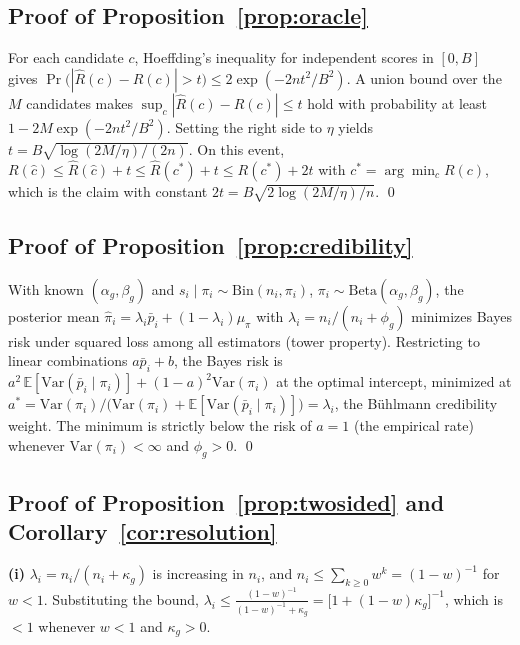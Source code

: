 \documentclass[twocolumn,10pt]{article}
\newcommand{\E}{\mathbb{E}}
\newcommand{\Var}{\mathrm{Var}}
\begin{document}
\subsection{Proof of Proposition~\ref{prop:oracle}}
For each candidate $c$, Hoeffding's inequality for independent scores in
$[0,B]$ gives
$\Pr\bigl(|\hat R(c)-R(c)|>t\bigr)\le2\exp(-2nt^2/B^2)$. A union bound
over the $M$ candidates makes
$\sup_c|\hat R(c)-R(c)|\le t$ hold with probability at least
$1-2M\exp(-2nt^2/B^2)$. Setting the right side to $\eta$ yields
$t=B\sqrt{\log(2M/\eta)/(2n)}$. On this event,
$R(\hat c)\le\hat R(\hat c)+t\le\hat R(c^{*})+t\le R(c^{*})+2t$ with
$c^{*}=\arg\min_c R(c)$, which is the claim with constant
$2t=B\sqrt{2\log(2M/\eta)/n}$. \qed

\subsection{Proof of Proposition~\ref{prop:credibility}}
With known $(\alpha_g,\beta_g)$ and $s_i\mid\pi_i\sim
\mathrm{Bin}(n_i,\pi_i)$, $\pi_i\sim\mathrm{Beta}(\alpha_g,\beta_g)$,
the posterior mean $\hat\pi_i=\lambda_i\bar p_i+(1-\lambda_i)\mu_\pi$
with $\lambda_i=n_i/(n_i+\phi_g)$ minimizes Bayes risk under squared
loss among all estimators (tower property). Restricting to linear
combinations $a\bar p_i+b$, the Bayes risk is
$a^2\,\E[\Var(\bar p_i\mid\pi_i)] + (1-a)^2\Var(\pi_i)$ at the optimal
intercept, minimized at
$a^{*}=\Var(\pi_i)/\bigl(\Var(\pi_i)+\E[\Var(\bar p_i\mid\pi_i)]\bigr)
=\lambda_i$, the B\"uhlmann credibility weight. The minimum is strictly
below the risk of $a=1$ (the empirical rate) whenever
$\Var(\pi_i)<\infty$ and $\phi_g>0$. \qed

\subsection{Proof of Proposition~\ref{prop:twosided} and
Corollary~\ref{cor:resolution}}

\textbf{(i)} $\lambda_i=n_i/(n_i+\kappa_g)$ is increasing in $n_i$, and
$n_i\le\sum_{k\ge0}w^{k}=(1-w)^{-1}$ for $w<1$. Substituting the bound,
$\lambda_i\le\frac{(1-w)^{-1}}{(1-w)^{-1}+\kappa_g}
=\bigl[1+(1-w)\kappa_g\bigr]^{-1}$, which is $<1$ whenever $w<1$ and
$\kappa_g>0$.
\end{document}

